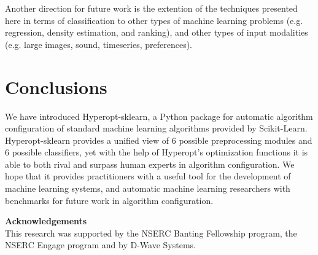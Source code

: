 \documentclass[wcp]{jmlr}
\begin{document}
Another direction for future work is the extention of the techniques presented here in terms of classification to other types of machine learning problems (e.g. regression, density estimation, and ranking),
and other types of input modalities (e.g. large images, sound, timeseries, preferences).



\section{Conclusions}

We have introduced Hyperopt-sklearn, a Python package for automatic algorithm configuration of standard machine learning algorithms provided by Scikit-Learn.
Hyperopt-sklearn provides a unified view of 6 possible preprocessing modules and 6 possible classifiers, yet with the help of Hyperopt's optimization functions
it is able to both rival and surpass human experts in algorithm configuration.
We hope that it provides practitioners with a useful tool for the development of machine learning systems,
and automatic machine learning researchers with benchmarks for future work in algorithm configuration.

\vspace{2em}
\noindent
{\bf Acknowledgements} \\
This research was supported by the NSERC Banting Fellowship program, the NSERC Engage program and by D-Wave Systems.





\end{document}
